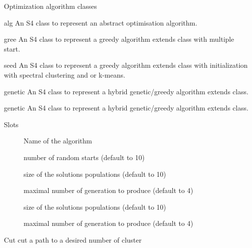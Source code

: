 \documentclass[letterpaper]{book}
\begin{document}
%
\begin{Description}\relax
Optimization algorithm classes

alg 
An S4 class to represent an abstract optimisation algorithm.

gree 
An S4 class to represent a greedy algorithm extends  class with multiple start.

seed 
An S4 class to represent a greedy algorithm extends  class with initialization with spectral clustering and or k-means.

genetic
An S4 class to represent a hybrid genetic/greedy algorithm extends  class.

genetic
An S4 class to represent a hybrid genetic/greedy algorithm extends  class.
\end{Description}
%
\begin{Section}{Slots}

\begin{description}

\item[] Name of the algorithm

\item[] number of random starts (default to 10)

\item[] size of the solutions populations (default to 10)

\item[] maximal number of generation to produce (default to 4)

\item[] size of the solutions populations (default to 10)

\item[] maximal number of generation to produce (default to 4)

\end{description}
\end{Section}
%
\begin{Description}\relax
Cut
cut a path to a desired number of cluster
\end{Description}
\end{document}
